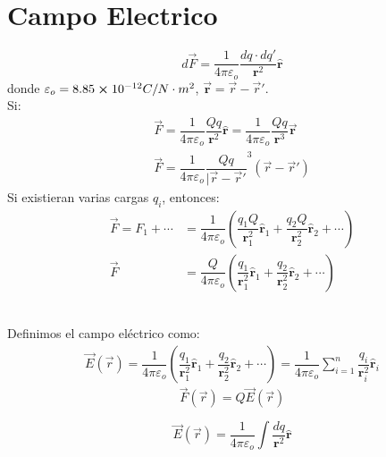 \documentclass[../main]{subfiles}
\begin{document}
\section{Campo Electrico}
\begin{minipage}{0.5\textwidth}
    \begin{equation}
        \boxed{d\vec{F}=\dfrac{1}{4\pi \varepsilon_o}\dfrac{dq \cdot dq'}{\mathbf{r}^2} \hat{\mathbf{r}}}
    \end{equation}
    donde $\varepsilon_o=8.85 \cross 10^{-12} C/N\cdot m^2$, $\vec{\mathbf{r}}=\vec{r}-\vec{r}'$. \\
    Si:
    \begin{align}
        \vec{F}=\dfrac{1}{4\pi \varepsilon_o} \dfrac{Qq}{\mathbf{r}^2}\hat{\mathbf{r}}=\dfrac{1}{4\pi \varepsilon_o} \dfrac{Q q}{\mathbf{r}^3}\vec{\mathbf{r}}\\
        \vec{F}=\dfrac{1}{4\pi \varepsilon_o} \dfrac{Qq}{|\vec{r}-\vec{r}'}^3 (\vec{r}-\vec{r}')
    \end{align}
    Si existieran varias cargas $q_i$, entonces:
    \begin{align}
        \vec{F}=F_1+\cdots&=\dfrac{1}{4\pi \varepsilon_o} \left( \dfrac{q_1 Q}{\mathbf{r}_1^2} \hat{\mathbf{r}}_1 + \dfrac{q_2 Q}{\mathbf{r}_2^2} \hat{\mathbf{r}}_2 + \cdots \right)\\
        \vec{F}&=\dfrac{Q}{4\pi \varepsilon_o} \left( \dfrac{q_1}{\mathbf{r}_1^2} \hat{\mathbf{r}}_1+\dfrac{q_2}{\mathbf{r}_2^2} \hat{\mathbf{r}}_2 +\cdots \right)
    \end{align}
\end{minipage}
\begin{minipage}{0.5\textwidth}
    
\end{minipage}
\\[0.5cm]
Definimos el campo eléctrico como:
\begin{align}
    \vec{E}({\vec{r}})=\dfrac{1}{4\pi \varepsilon_o}\left( \dfrac{q_1}{\mathbf{r}_1^2}\hat{\mathbf{r}}_1+\dfrac{q_2}{\mathbf{r}_2^2}\hat{\mathbf{r}}_2+\cdots \right)=\dfrac{1}{4\pi \varepsilon_o} \sum_{i=1}^n \dfrac{q_i}{\mathbf{r}_i^2}\hat{\mathbf{r}}_i
\end{align}
\begin{equation}
    \boxed{\vec{F}({\vec{r}})=Q \vec{E}({\vec{r}})}
\end{equation}
\begin{minipage}{0.5\textwidth}
    \begin{equation}
        \vec{E}({\vec{r}})=\dfrac{1}{4\pi \varepsilon_o} \int \dfrac{dq}{\mathbf{r}^2}\hat{\mathbf{r}}
    \end{equation}
\end{minipage}
\end{document}
